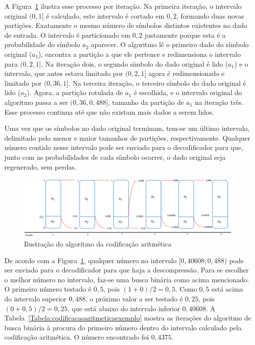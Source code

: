 A Figura~\ref{fig:arithmeticencoding} ilustra esse processo por iteração. Na
primeira iteração, o intervalo original $(0, 1]$ é calculado, este intervalo é
cortado em $0,2$, formando duas novas partições. Exatamente o mesmo número de
símbolos distintos existentes no dado de entrada. O intervalo é particionado em
$0,2$ justamente porque esta é a probabilidade do símbolo $a_2$ aparecer. O
algoritmo lê o primeiro dado do símbolo original ($a_1$), encontra a partição a
que ele pertence e redimensiona o intervalo para $(0,2, 1]$. Na iteração dois, o
segundo símbolo do dado original é lido ($a_1$) e o intervalo, que antes estava
limitado por $(0,2, 1]$ agora é redimensionado e limitado por $(0,36, 1]$. Na
terceira iteração, o terceiro símbolo do dado original é lido ($a_2$). Agora, a
partição rotulada de $a_1$ é escolhida, e o intervalo original do algoritmo
passa a ser $(0,36, 0,488]$, tamanho da partição de $a_1$ na iteração três. Esse
processo continua até que não existam mais dados a serem lidos.

Uma vez que os símbolos no dado original terminam, tem-se um último intervalo,
delimitado pelo menor e maior tamanhos de partições, respectivamente. Qualquer
número contido nesse intervalo pode ser enviado para o decodificador para que,
junto com as probabilidades de cada símbolo ocorrer, o dado original seja
regenerado, sem perdas.

\begin{figure}[ht]
\centering
\includegraphics[scale=0.45]{fig/arithmeticencoding.png}
\caption[Ilustração do algoritmo da codificação aritmética]{Ilustração do
algoritmo da codificação aritmética}
\label{fig:arithmeticencoding}
\end{figure}


De acordo com a Figura~\ref{fig:arithmeticencoding}, qualquer número no
intervalo $[0,40608; 0,488)$ pode ser enviado para o decodificador para que haja
a descompressão. Para se escolher o melhor número no intervalo, faz-se uma busca
binária como acima mencionado. O primeiro número testado é $0,5$, pois $(1 + 0)
/ 2 = 0,5$. Como $0,5$ está acima do intervalo superior $0,488$, o próximo valor a
ser testado é $0,25$, pois $(0 + 0,5) / 2 = 0,25$, que está abaixo do intervalo
inferior $0,40608$. A Tabela~\ref{Tabela:codificacaoaritmeticaexemplo} mostra as
iterações do algoritmo de busca binária à procura do primeiro número dentro do
intervalo calculado pela codificação aritmética. O número encontrado foi
$0,4375$.

